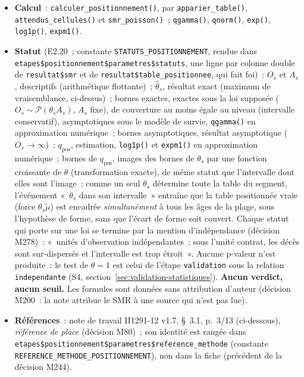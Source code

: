 \documentclass[a4paper,11pt]{article}
\newcommand{\code}[1]{\texttt{\small #1}}
\begin{document}
{\begin{itemize}[leftmargin=*, itemsep=2pt]
    \code{positionnee} sont calculés sur la force, $\hat\theta_s
    \tilde\mu_c$, jamais relus dans la table positionnée~: ils restent
    finis dans ce cas.
  \item \textbf{Calcul}~: \code{calculer\_positionnement()}, par
    \code{apparier\_table()}, \code{attendus\_cellules()} et
    \code{smr\_poisson()}~; \code{qgamma()}, \code{qnorm()}, \code{exp()},
    \code{log1p()}, \code{expm1()}.
  \item \textbf{Statut} (E2.20~; constante \code{STATUTS\_POSITIONNEMENT},
    rendue dans \code{etapes\$positionnement\$parametres\$statuts}, une
    ligne par colonne double de \code{resultat\$smr} et de
    \code{resultat\$table\_positionnee}, qui fait foi)~: $O_s$ et $A_s$,
    descriptifs (arithmétique flottante)~; $\hat\theta_s$, résultat exact
    (maximum de vraisemblance, ci-dessus)~; bornes exactes, exactes sous la
    loi supposée ($O_s \sim \mathcal{P}(\theta_s A_s)$, $A_s$ fixe), de
    couverture au moins égale au niveau (intervalle conservatif),
    asymptotiques sous le modèle de survie, \code{qgamma()} en
    approximation numérique~; bornes asymptotiques, résultat asymptotique
    ($O_s \to \infty$)~; $q_{\mathrm{pos}}$, estimation, \code{log1p()} et
    \code{expm1()} en approximation numérique~; bornes de $q_{\mathrm{pos}}$,
    images des bornes de $\theta_s$ par une fonction croissante de
    $\theta$ (transformation exacte), de même statut que l'intervalle dont
    elles sont l'image~: comme un seul $\theta_s$ détermine toute la table
    du segment, l'événement «~$\theta_s$ dans son intervalle~» entraîne
    que la table positionnée vraie (force $\theta_s \tilde\mu$) est
    encadrée \emph{simultanément} à tous les âges de la plage, sous
    l'hypothèse de forme, sans que l'écart de forme soit couvert. Chaque
    statut qui porte sur une loi se termine par la mention
    d'indépendance (décision M278)~: «~unités d'observation
    indépendantes~; sous l'unité contrat, les décès sont sur-dispersés et
    l'intervalle est trop étroit~». Aucune p-valeur n'est produite~: le
    test de $\theta = 1$ est celui de l'étape \code{validation} sous la
    relation \code{independante} (S4, section~\ref{sec:validation-statistiques}).
    \textbf{Aucun verdict, aucun seuil.} Les formules sont données sans
    attribution d'auteur (décision M200~: la note attribue le SMR à une
    source qui n'est pas lue).
  \item \textbf{Références}~: note de travail II1291-12 v1.7, §~3.1,
    p.~3/13 (ci-dessous), \emph{référence de place} (décision M80)~; son
    identité est rangée dans
    \code{etapes\$positionnement\$parametres\$}\allowbreak\code{reference\_methode}
    (constante \code{REFERENCE\_METHODE\_POSITIONNEMENT}), non dans la
    fiche (précédent de la décision M244).
\end{itemize}\par}
\end{document}
